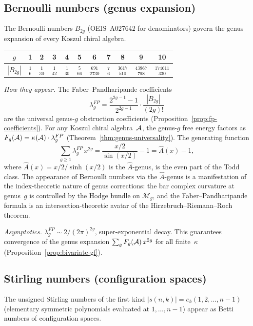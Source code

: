 \subsection{Bernoulli numbers (genus expansion)}
\label{subsec:bernoulli}

The Bernoulli numbers $B_{2g}$ (OEIS~A027642 for denominators) govern the genus expansion of every Koszul chiral algebra.

\begin{center}
\renewcommand{\arraystretch}{1.2}
\begin{tabular}{c|cccccccccc}
$g$ & 1 & 2 & 3 & 4 & 5 & 6 & 7 & 8 & 9 & 10 \\
\hline
$|B_{2g}|$ & $\tfrac{1}{6}$ & $\tfrac{1}{30}$ & $\tfrac{1}{42}$ & $\tfrac{1}{30}$ & $\tfrac{5}{66}$ & $\tfrac{691}{2730}$ & $\tfrac{7}{6}$ & $\tfrac{3617}{510}$ & $\tfrac{43867}{798}$ & $\tfrac{174611}{330}$
\end{tabular}
\end{center}

\emph{How they appear.}
The Faber--Pandharipande coefficients
\[
\lambda_g^{FP} = \frac{2^{2g-1}-1}{2^{2g-1}} \cdot \frac{|B_{2g}|}{(2g)!}
\]
are the universal genus-$g$ obstruction coefficients (Proposition~\ref{prop:fp-coefficients}).  For any Koszul chiral algebra~$\mathcal{A}$, the genus-$g$ free energy factors as $F_g(\mathcal{A}) = \kappa(\mathcal{A}) \cdot \lambda_g^{FP}$ (Theorem~\ref{thm:genus-universality}).  The generating function
\[
\sum_{g \geq 1} \lambda_g^{FP}\, x^{2g}
= \frac{x/2}{\sin(x/2)} - 1
= \hat{A}(x) - 1,
\]
where $\hat{A}(x) = x/2 / \sinh(x/2)$ is the $\hat{A}$-genus, is the even part of the Todd class.  The appearance of Bernoulli numbers via the $\hat{A}$-genus is a manifestation of the index-theoretic nature of genus corrections: the bar complex curvature at genus~$g$ is controlled by the Hodge bundle on $\overline{\mathcal{M}}_g$, and the Faber--Pandharipande formula is an intersection-theoretic avatar of the Hirzebruch--Riemann--Roch theorem.

\emph{Asymptotics.}
$\lambda_g^{FP} \sim 2/(2\pi)^{2g}$, super-exponential decay.  This guarantees convergence of the genus expansion $\sum_g F_g(\mathcal{A})\,x^{2g}$ for all finite~$\kappa$ (Proposition~\ref{prop:bivariate-gf}).

\subsection{Stirling numbers (configuration spaces)}
\label{subsec:stirling}

The unsigned Stirling numbers of the first kind $|s(n,k)| = e_k(1, 2, \ldots, n-1)$ (elementary symmetric polynomials evaluated at $1, \ldots, n-1$) appear as Betti numbers of configuration spaces.

